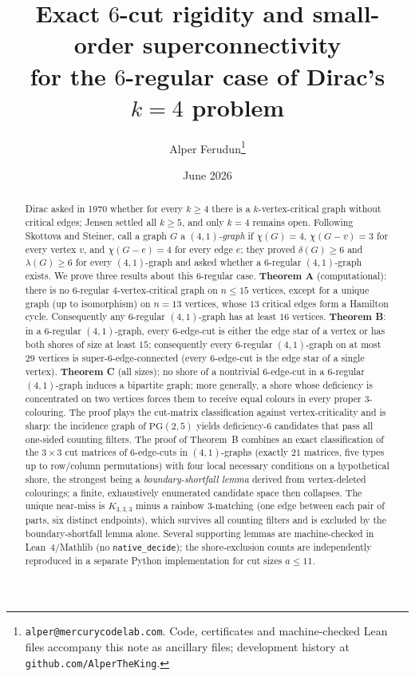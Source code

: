\documentclass[11pt]{article}
\title{Exact $6$-cut rigidity and small-order superconnectivity\\
for the $6$-regular case of Dirac's $k=4$ problem}
\author{Alper Ferudun\thanks{\texttt{alper@mercurycodelab.com}. Code, certificates
and machine-checked Lean files accompany this note as ancillary files; development
history at \texttt{github.com/AlperTheKing}.}}
\date{June 2026}
\theoremstyle{remark}
\begin{document}
\maketitle

\begin{abstract}
Dirac asked in 1970 whether for every $k\ge 4$ there is a $k$-vertex-critical graph
without critical edges; Jensen settled all $k\ge 5$, and only $k=4$ remains open.
Following Skottova and Steiner, call a graph $G$ a \emph{$(4,1)$-graph} if
$\chi(G)=4$, $\chi(G-v)=3$ for every vertex $v$, and $\chi(G-e)=4$ for every edge
$e$; they proved $\delta(G)\ge 6$ and $\lambda(G)\ge 6$ for every $(4,1)$-graph and
asked whether a $6$-regular $(4,1)$-graph exists. We prove three results about this
$6$-regular case. \textbf{Theorem A} (computational): there is no
$6$-regular $4$-vertex-critical graph on $n\le 15$ vertices, except for a unique
graph (up to isomorphism) on $n=13$ vertices, whose $13$ critical edges form a
Hamilton cycle. Consequently any $6$-regular $(4,1)$-graph has at least $16$
vertices.
\textbf{Theorem B}: in a $6$-regular $(4,1)$-graph, every $6$-edge-cut is either the
edge star of a vertex or has both shores of size at least $15$; consequently every
$6$-regular $(4,1)$-graph on at most $29$ vertices is super-$6$-edge-connected (every
$6$-edge-cut is the edge star of a single vertex).
\textbf{Theorem C} (all sizes): no shore of a nontrivial $6$-edge-cut in a
$6$-regular $(4,1)$-graph induces a bipartite graph; more generally, a shore whose
deficiency is concentrated on two vertices forces them to receive equal colours in
every proper $3$-colouring. The proof plays the cut-matrix classification against
vertex-criticality and is sharp: the incidence graph of $\mathrm{PG}(2,5)$ yields
deficiency-$6$ candidates that pass all one-sided counting filters.
The proof of Theorem~B combines an exact classification of the $3\times 3$ cut
matrices of $6$-edge-cuts in $(4,1)$-graphs (exactly $21$ matrices, five types up to
row/column permutations) with four local necessary conditions on a hypothetical
shore, the strongest being a \emph{boundary-shortfall lemma} derived from
vertex-deleted colourings; a finite, exhaustively enumerated candidate space then
collapses. The unique near-miss is $K_{3,3,3}$ minus a rainbow $3$-matching (one edge
between each pair of parts, six distinct endpoints), which survives all counting
filters and is excluded by the boundary-shortfall lemma alone. Several supporting
lemmas are machine-checked in Lean~4/Mathlib (no \texttt{native\_decide}); the
shore-exclusion counts are independently reproduced in a separate Python
implementation for cut sizes $a\le 11$.
\end{abstract}
\end{document}
